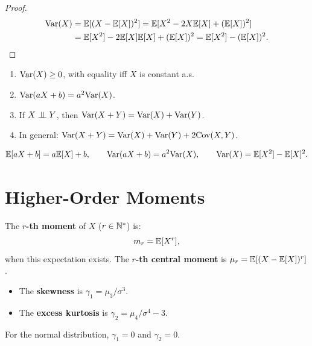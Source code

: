 \begin{proof}
\begin{align*}
    \mathrm{Var}(X) &= \mathbb{E}[(X - \mathbb{E}[X])^2]
    = \mathbb{E}[X^2 - 2X\mathbb{E}[X] + (\mathbb{E}[X])^2] \\
    &= \mathbb{E}[X^2] - 2\mathbb{E}[X]\mathbb{E}[X] + (\mathbb{E}[X])^2
    = \mathbb{E}[X^2] - (\mathbb{E}[X])^2. \qedhere
\end{align*}
\end{proof}

\begin{proposition}
\begin{enumerate}[label=(\roman*)]
    \item $\mathrm{Var}(X) \geq 0$, with equality iff $X$ is constant a.s.
    \item $\mathrm{Var}(aX + b) = a^2\mathrm{Var}(X)$.
    \item If $X \perp\!\!\!\perp Y$, then $\mathrm{Var}(X + Y) = \mathrm{Var}(X) + \mathrm{Var}(Y)$.
    \item In general: $\mathrm{Var}(X+Y) = \mathrm{Var}(X) + \mathrm{Var}(Y) + 2\mathrm{Cov}(X,Y)$.
\end{enumerate}
\end{proposition}

\begin{keyformulas}[title=\textbf{Summary: expectation and variance}]
\[
    \mathbb{E}[aX+b] = a\mathbb{E}[X]+b, \qquad \mathrm{Var}(aX+b) = a^2\mathrm{Var}(X), \qquad
    \mathrm{Var}(X) = \mathbb{E}[X^2] - \mathbb{E}[X]^2.
\]
\end{keyformulas}

\section{Higher-Order Moments}

\begin{definition}
The \textbf{$r$-th moment} of $X$ ($r \in \mathbb{N}^*$) is:
\[
    m_r = \mathbb{E}[X^r],
\]
when this expectation exists. The \textbf{$r$-th central moment} is
$\mu_r = \mathbb{E}[(X - \mathbb{E}[X])^r]$.
\end{definition}

\begin{definition}
\begin{itemize}
    \item The \textbf{skewness} is $\gamma_1 = \mu_3/\sigma^3$.
    \item The \textbf{excess kurtosis} is $\gamma_2 = \mu_4/\sigma^4 - 3$.
\end{itemize}
For the normal distribution, $\gamma_1 = 0$ and $\gamma_2 = 0$.
\end{definition}


